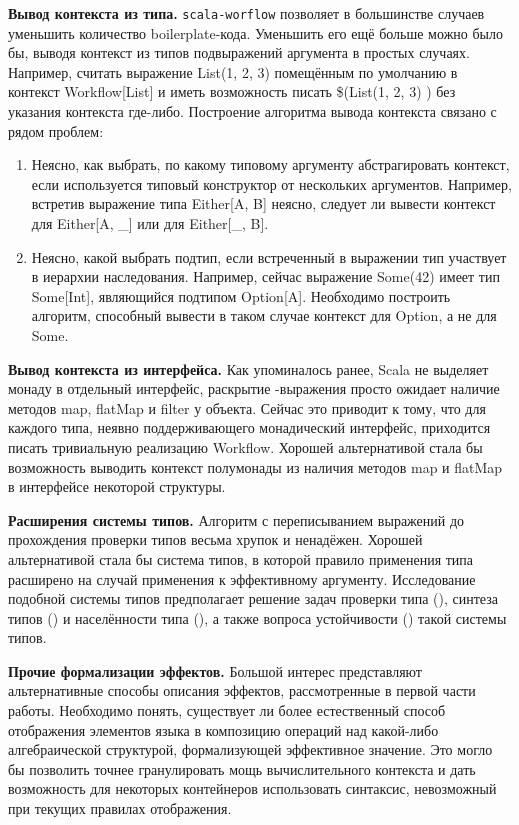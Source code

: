 \textbf{Вывод контекста из типа.} \texttt{scala-worflow} позволяет в большинстве случаев уменьшить количество boilerplate-кода. Уменьшить его ещё больше можно было бы, выводя контекст из типов подвыражений аргумента в простых случаях. Например, считать выражение \<List(1, 2, 3) \> помещённым по умолчанию в контекст \<Workflow[List]\> и иметь возможность писать \<\$(List(1, 2, 3) )\> без указания контекста где-либо. Построение алгоритма вывода контекста связано с рядом проблем:
\begin{enumerate}
  \item Неясно, как выбрать, по какому типовому аргументу абстрагировать контекст, если используется типовый конструктор от нескольких аргументов. Например, встретив выражение типа \<Either[A, B]\> неясно, следует ли вывести контекст для \<Either[A, \_]\> или для \<Either[\_, B]\>.
  \item Неясно, какой выбрать подтип, если встреченный в выражении тип участвует в иерархии наследования. Например, сейчас выражение \<Some(42)\> имеет тип \<Some[Int]\>, являющийся подтипом \<Option[A]\>. Не\-обходимо построить алгоритм, способный вывести в таком случае контекст для \<Option\>, а не для \<Some\>.
\end{enumerate}

\textbf{Вывод контекста из интерфейса.} Как упоминалось ранее, Scala не выделяет монаду в отдельный интерфейс, раскрытие \<\>-выражения просто ожидает наличие методов \<map\>, \<flatMap\> и \<filter\> у объекта. Сейчас это приводит к тому, что для каждого типа, неявно поддерживающего монадический интерфейс, приходится писать тривиальную реализацию \<Workflow\>. Хорошей альтернативой стала бы возможность выводить контекст полумонады из наличия методов \<map\> и \<flatMap\> в интерфейсе некоторой структуры.

\textbf{Расширения системы типов.} Алгоритм с переписыванием выражений до прохождения проверки типов весьма хрупок и ненадёжен. Хорошей альтернативой стала бы система типов, в которой правило применения типа расширено на случай применения к эффективному аргументу. Исследование подобной системы типов предполагает решение задач проверки типа (), синтеза типов () и населённости типа (), а также вопроса устойчивости () такой системы типов.

\textbf{Прочие формализации эффектов.} Большой интерес представляют альтернативные способы описания эффектов, рассмотренные в первой части работы. Необходимо понять, существует ли более естественный способ отображения элементов языка в композицию операций над какой-либо алгебраической структурой, формализующей эффективное значение. Это могло бы позволить точнее гранулировать мощь вычислительного контекста и дать возможность для некоторых контейнеров использовать синтаксис, невозможный при текущих правилах отображения.


